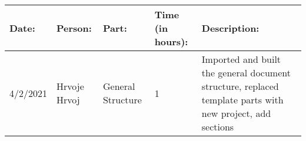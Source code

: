 \begin{table}[h]
    \begin{tabular}{|p{2cm}|p{2cm}|p{2.5cm}|p{1.5cm}|p{7.5cm}|}
        \hline

        Date:      & Person:       & Part:             & Time (in hours): & Description:                                       \\ \hline
        4/2/2021   & Hrvoje Hrvoj & General Structure & 1                 & Imported and built the general document structure, replaced template parts with new project, add sections\\ \hline
    \end{tabular}
\end{table}
